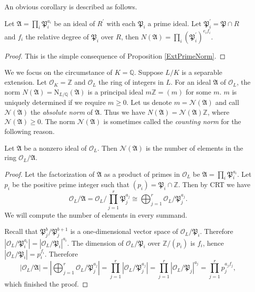 An obvious corollary is described as follows.
\begin{corollary}
Let $\mathfrak{A}=\prod_i\mathfrak{P}_i^{a_i}$ be an ideal of $R^\prime$ with each $\mathfrak{P}_i$ a prime ideal. Let $\mathfrak{P}_i^\prime=\mathfrak{P}\cap R$ and $f_i$ the relative degree of $\mathfrak{P}_i$ over $R$, then $N(\mathfrak{A})=\prod_{i}(\mathfrak{P}_i^\prime)^{e_if_i}$.
\end{corollary}
\begin{proof}
This is the simple consequence of Proposition \ref{ExtPrimeNorm}.
\end{proof}
We we focus on the circumstance of $K=\mathbb{Q}$. Suppose $L/K$ is a separable extension. Let $\mathcal{O}_K=\mathbb{Z}$ and $\mathcal{O}_L$ the ring of integers in $L$. For an ideal $\mathfrak{A}$ of $\mathcal{O}_L$, the norm $N(\mathfrak{A})=\mathrm{N}_{L/\mathbb{Q}}(\mathfrak{A})$ is a principal ideal $m\mathbb{Z}=(m)$ for some $m$. $m$ is uniquely determined if we require $m\ge 0$. Let us denote $m=\mathcal{N}(\mathfrak{A})$ and call $\mathcal{N}(\mathfrak{A})$ the \textit{absolute norm} of $\mathfrak{A}$. Thus we have $N(\mathfrak{A})=\mathcal{N}(\mathfrak{A})\mathbb{Z}$, where $\mathcal{N}(\mathfrak{A})\ge 0$. The norm $\mathcal{N}(\mathfrak{A})$ is sometimes called the \textit{counting norm} for the following reason.
\begin{proposition}
Let $\mathfrak{A}$ be a nonzero ideal of $\mathcal{O}_L$. Then $\mathcal{N}(\mathfrak{A})$ is the number of elements in the ring $\mathcal{O}_L/\mathfrak{A}$.
\end{proposition}
\begin{proof}
Let the factorization of $\mathfrak{A}$ as a product of primes in $\mathcal{O}_L$ be $\mathfrak{A}=\prod_i\mathfrak{P}_i^{a_i}$. Let $p_i$ be the positive prime integer such that $(p_i)=\mathfrak{P}_i\cap\mathbb{Z}$. Then by CRT we have 
$$
\mathcal{O} _L/\mathfrak{A} =\mathcal{O} _L/\prod_{j=1}^r{\mathfrak{P} _{j}^{a_j}}\cong \bigoplus_{j=1}^r{\mathcal{O} _L/\mathfrak{P} _{j}^{a_j}}.
$$
We will compute the number of elements in every summand.\par
Recall that $\mathfrak{P}_j^{b}/\mathfrak{P}_j^{b+1}$ is a one-dimensional vector space of $\mathcal{O}_L/\mathfrak{P}_i$. Therefore $|\mathcal{O}_L/\mathfrak{P}_i^{a_i}|=|\mathcal{O}_L/\mathfrak{P}_i|^{a_i}$. The dimension of $\mathcal{O}_L/\mathfrak{P}_i$ over $\mathbb{Z}/(p_i)$ is $f_i$, hence $|\mathcal{O}_L/\mathfrak{P}_i|=p_i^{f_i}$. Therefore 
$$
\left| \mathcal{O} _L/\mathfrak{A} \right|=\left| \bigoplus_{j=1}^r{\mathcal{O} _L/\mathfrak{P} _{j}^{a_j}} \right|=\prod_{j=1}^r{\left| \mathcal{O} _L/\mathfrak{P} _{j}^{a_j} \right|}=\prod_{j=1}^r{\left| \mathcal{O} _L/\mathfrak{P} _j \right|^{a_j}}=\prod_{j=1}^r{p_{j}^{a_jf_j}},
$$
which finished the proof.
\end{proof}
